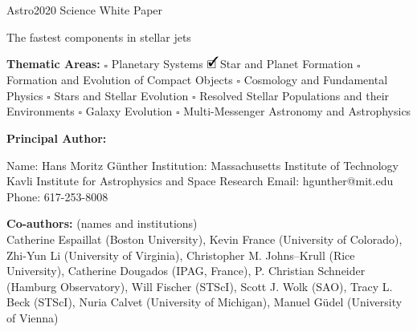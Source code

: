 \documentclass[12pt]{article}
\newcommand{\cmark}{\ding{51}}%
\newcommand{\done}{\rlap{$\square$}{\raisebox{2pt}{\large\hspace{1pt}\cmark}}%
\hspace{-2.5pt}}
\begin{document}
\raggedright
\huge
Astro2020 Science White Paper \linebreak

The fastest components in stellar jets \linebreak
\normalsize

\noindent \textbf{Thematic Areas:} \hspace*{60pt} $\square$ Planetary Systems \hspace*{10pt} $\done$ Star and Planet Formation \hspace*{20pt}\linebreak
$\square$ Formation and Evolution of Compact Objects \hspace*{31pt} $\square$ Cosmology and Fundamental Physics \linebreak
  $\square$  Stars and Stellar Evolution \hspace*{1pt} $\square$ Resolved Stellar Populations and their Environments \hspace*{40pt} \linebreak
  $\square$    Galaxy Evolution   \hspace*{45pt} $\square$             Multi-Messenger Astronomy and Astrophysics \hspace*{65pt} \linebreak
  
\textbf{Principal Author:}

Name:	Hans Moritz G\"unther
 \linebreak						
Institution: Massachusetts Institute of Technology
Kavli Institute for Astrophysics and Space Research 
 \linebreak
Email: hgunther@mit.edu
 \linebreak
Phone:  617-253-8008
 \linebreak
 
\textbf{Co-authors:} (names and institutions)\\
Catherine Espaillat (Boston University),
Kevin France (University of Colorado),
Zhi-Yun Li (University of Virginia), Christopher M. Johns--Krull (Rice University), Catherine Dougados (IPAG, France),
P. Christian Schneider (Hamburg Observatory), Will Fischer (STScI), Scott
J. Wolk (SAO), Tracy L. Beck (STScI), Nuria Calvet (University of Michigan),
Manuel G\"udel (University of Vienna)
  \linebreak
\end{document}
